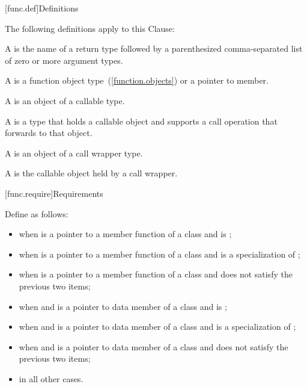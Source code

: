 [func.def]{Definitions}

\pnum
The following definitions apply to this Clause:

\pnum
{}%
A  is the name of a return type followed by a
parenthesized comma-separated list of zero or more argument types.

\pnum
{}%
A  is a function object type~(\ref{function.objects}) or a pointer to member.

\pnum
{}%
A  is an object of a callable type.

\pnum
{}%
A  is a type that holds a callable object
and supports a call operation that forwards to that object.

\pnum
{}%
A  is an object of a call wrapper type.

\pnum
{}%
A  is the callable object held by a call wrapper.

[func.require]{Requirements}

\pnum
{}%
Define  as follows:

\begin{itemize}
\item {} when  is a pointer to a
member function of a class 
and  is ;

\item {} when  is a pointer to a
member function of a class 
and  is a specialization of ;

\item {} when  is a pointer to a
member function of a class 
and  does not satisfy the previous two items;

\item {} when  and  is a pointer to
data member of a class 
and  is ;

\item {} when  and  is a pointer to
data member of a class 
and  is a specialization of ;

\item {} when  and  is a pointer to
data member of a class 
and  does not satisfy the previous two items;

\item {} in all other cases.
\end{itemize}

